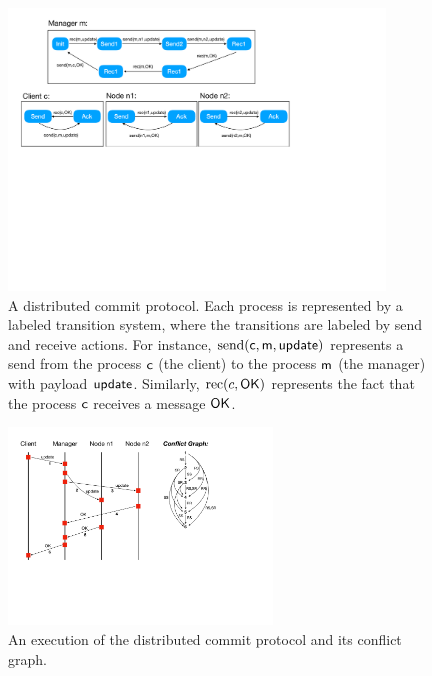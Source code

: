 \begin{figure}[t]
\includegraphics[width=10cm]{commit.pdf}
\caption{A distributed commit protocol. Each process is represented by a labeled transition system, where the transitions are labeled by send and receive actions. For instance, $\mathrm{send}({\sf{c},\sf{m},\sf{update}})$ represents a send from the process $\sf{c}$ (the client) to the process $\sf{m}$ (the manager) with payload $\sf{update}$. Similarly, $\mathrm{rec}({c,\sf{OK}})$ represents the fact that the process $\sf{c}$ receives a message 
$\sf{OK}$.}
\label{fig:commit}
\end{figure}

\begin{figure}[t]
\includegraphics[width=7cm]{MSC-commit.pdf}
\caption{An execution of the distributed commit protocol and its conflict graph.}
\label{fig:commit-exec}
\end{figure}

